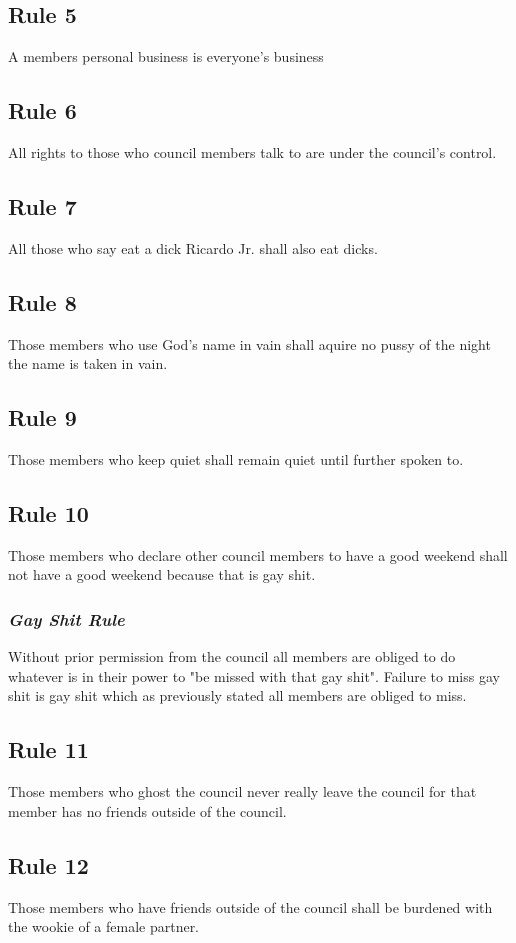 \documentclass[]{article}
\begin{document}
\subsection{Rule 5}
A members personal business is everyone's business

\subsection{Rule 6}
All rights to those who council members talk to are under the council's control.

\subsection{Rule 7}
All those who say eat a dick Ricardo Jr. shall also eat dicks.

\subsection{Rule 8}
Those members who use God's name in vain shall aquire no pussy of the night the name is taken in vain.

\subsection{Rule 9}
Those members who keep quiet shall remain quiet until further spoken to.

\subsection{Rule 10}
Those members who declare other council members to have a good weekend shall not have a good weekend because that is gay shit.
\subsubsection{\textit{Gay Shit Rule}}
Without prior permission from the council all members are obliged to do whatever is in their power to "be missed with that gay shit". Failure to miss gay shit is gay shit which as previously stated all members are obliged to miss.

\subsection{Rule 11}
Those members who ghost the council never really leave the council for that member has no friends outside of the council.

\subsection{Rule 12}
Those members who have friends outside of the council shall be burdened with the wookie of a female partner.
\end{document}
